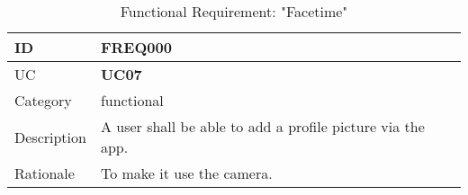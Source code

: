 \begin{comment}

\vspace{5mm}
\begin{table}[H]
	\begin{tabular}{ |p{2cm}||p{9cm}| }
		\hline
        ID & \textbf{FREQ005}\\ \hline
        UC & \textbf{UC01} \\ \hline
		Category & functional \\ \hline
		Description &
		
		\\ \hline
		Rationale &  \\ \hline
	\end{tabular}
	\caption{Functional Requirement: ""}
\end{table}
\end{comment}


\vspace{5mm}
\begin{table}[H]
	\begin{tabular}{ |p{2cm}||p{9cm}| }
		\hline
        ID & \textbf{FREQ000}\\ \hline
        UC & \textbf{UC07} \\ \hline
		Category & functional \\ \hline
		Description &
		A user shall be able to add a profile picture via the app.
		\\ \hline
		Rationale & To make it use the camera. \\ \hline
	\end{tabular}
	\caption{Functional Requirement: "Facetime"}
\end{table}

